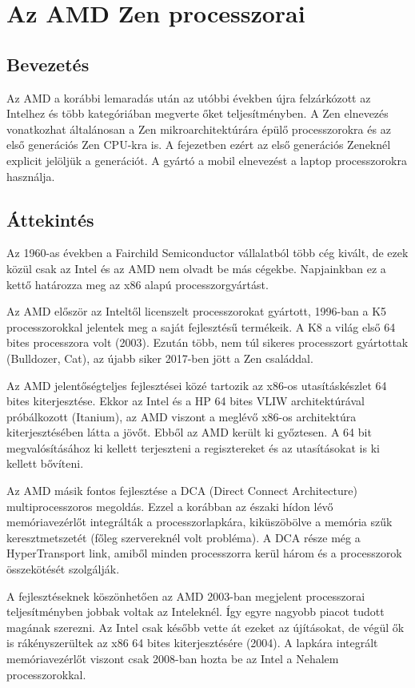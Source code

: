 
\chapter{Az AMD Zen processzorai}

\section{Bevezetés}
Az AMD a korábbi lemaradás után az utóbbi években újra felzárkózott az Intelhez és több kategóriában megverte őket teljesítményben.
A Zen elnevezés vonatkozhat általánosan a Zen mikroarchitektúrára épülő processzorokra és az első generációs Zen CPU-kra is.
A fejezetben ezért az első generációs Zeneknél explicit jelöljük a generációt.
A gyártó a mobil elnevezést a laptop processzorokra használja.

\section{Áttekintés}
Az 1960-as években a Fairchild Semiconductor vállalatból több cég kivált, de ezek közül csak az Intel és az AMD nem olvadt be más cégekbe.
Napjainkban ez a kettő határozza meg az x86 alapú processzorgyártást.

Az AMD először az Inteltől licenszelt processzorokat gyártott, 1996-ban a K5 processzorokkal jelentek meg a saját fejlesztésű termékeik.
A K8 a világ első 64 bites processzora volt (2003).
Ezután több, nem túl sikeres processzort gyártottak (Bulldozer, Cat), az újabb siker 2017-ben jött a Zen családdal.

Az AMD jelentőségteljes fejlesztései közé tartozik az x86-os utasításkészlet 64 bites kiterjesztése.
Ekkor az Intel és a HP 64 bites VLIW architektúrával próbálkozott (Itanium), az AMD viszont a meglévő x86-os architektúra kiterjesztésében látta a jövőt.
Ebből az AMD került ki győztesen.
A 64 bit megvalósításához ki kellett terjeszteni a regisztereket és az utasításokat is ki kellett bővíteni.

Az AMD másik fontos fejlesztése a DCA (Direct Connect Architecture) multiprocesszoros megoldás.
Ezzel a korábban az északi hídon lévő memóriavezérlőt integrálták a processzorlapkára, kiküszöbölve a memória szűk keresztmetszetét (főleg szervereknél volt probléma).
A DCA része még a HyperTransport link, amiből minden processzorra kerül három és a processzorok összekötését szolgálják.

A fejlesztéseknek köszönhetően az AMD 2003-ban megjelent processzorai teljesítményben jobbak voltak az Inteleknél.
Így egyre nagyobb piacot tudott magának szerezni.
Az Intel csak később vette át ezeket az újításokat, de végül ők is rákényszerültek az x86 64 bites kiterjesztésére (2004).
A lapkára integrált memóriavezérlőt viszont csak 2008-ban hozta be az Intel a Nehalem processzorokkal.

